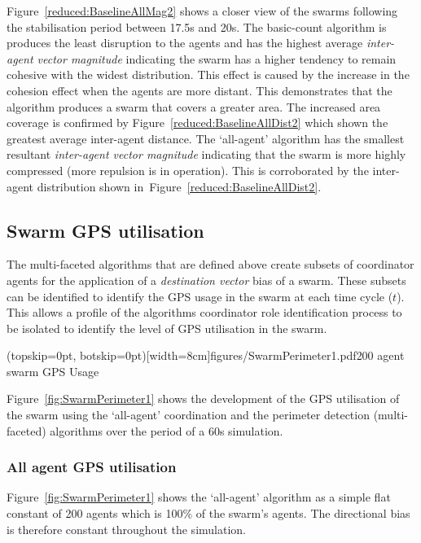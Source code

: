 \documentclass{ieeeaccess}
\begin{document}
Figure~\ref{reduced:BaselineAllMag2} shows a closer view of the swarms following the stabilisation period between 17.5s and 20s. The basic-count algorithm is produces the least disruption to the agents and has the highest average \textit{inter-agent vector magnitude} indicating the swarm has a higher tendency to remain cohesive with the widest distribution. This effect is caused by the increase in the cohesion effect when the agents are more distant. This demonstrates that the algorithm produces a swarm that covers a greater area. The increased area coverage is confirmed by Figure~\ref{reduced:BaselineAllDist2} which shown the greatest average inter-agent distance. The `all-agent' algorithm has the smallest resultant \textit{inter-agent vector magnitude} indicating that the swarm is more highly compressed (more repulsion is in operation). This is corroborated by the inter-agent distribution shown in~Figure~\ref{reduced:BaselineAllDist2}.

\subsection{Swarm GPS utilisation\label{section:compareGPSUages1}}
The multi-faceted algorithms that are defined above create subsets of coordinator agents for the application of a \textit{destination vector} bias of a swarm. These subsets can be identified to identify the GPS usage in the swarm at each time cycle ($t$). This allows a profile of the algorithms coordinator role identification process to be isolated to identify the level of GPS utilisation in the swarm.


\Figure[t!](topskip=0pt, botskip=0pt)[width=8cm]{figures/SwarmPerimeter1.pdf}{200 agent swarm GPS Usage\label{fig:SwarmPerimeter1}}

Figure~\ref{fig:SwarmPerimeter1} shows the development of the GPS utilisation of the swarm using the `all-agent' coordination and the perimeter detection (multi-faceted) algorithms over the period of a 60s simulation. 

\subsubsection{All agent GPS utilisation\label{section:SwarmPerimeter2}}
Figure~\ref{fig:SwarmPerimeter1} shows the `all-agent' algorithm as a simple flat constant of 200 agents which is 100\% of the swarm's agents. The directional bias is therefore constant throughout the simulation. 
\end{document}
